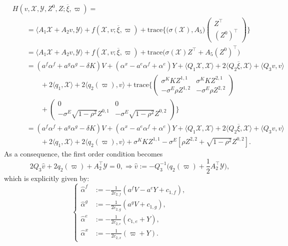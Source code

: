 \documentclass[11pt,twoside]{amsart}
\theoremstyle{definition}
\numberwithin{equation}{section}
\newcommand{\w}{\varpi}
\renewcommand{\bar}{\overline}
\begin{document}
\begin{align*}
&H(v,\mathcal{X}, \mathcal{Y},Z^0,Z;\bar{\xi},\w)= \\
&\qquad =  \langle A_1 \mathcal{X} + A_2v,\mathcal{Y}\rangle + f(\mathcal{X}, v; \bar{\xi}, \w)	+ \text{trace}\bigg\{\bigg( \sigma(\mathcal{X}),A_5\bigg)\begin{pmatrix}
    Z^\top\\
    (Z^0)^\top\end{pmatrix}\bigg\}\\
&\qquad= \langle A_1 \mathcal{X} + A_2v,\mathcal{Y}\rangle + f(\mathcal{X}, v; \bar{\xi}, \w)	+ \text{trace}\bigg( \sigma( \mathcal{X} ) Z^\top +  A_5(Z^0)^\top\bigg) 	\\
&\qquad= (a^f\alpha^{f} + a^g\alpha^{g}- \delta K)V + (\alpha^x -a^e\alpha^f + \alpha^e) Y + \langle Q_1 \mathcal{X} ,\mathcal{X}\rangle+ 2\langle Q_2\overline{\xi}, \mathcal{X}\rangle + \langle Q_3 v, v\rangle  \\
&\qquad\qquad+2\langle q_1, \mathcal{X}\rangle + 2 \langle q_2(\w),v\rangle + \text{trace}\bigg\{ 
\begin{pmatrix}
    \sigma^K K Z^{1,1} & \sigma^K K Z^{2,1}\\
    -\sigma^E \rho Z^{1,2} & -\sigma^E \rho Z^{2,2} 
\end{pmatrix} \\
&\qquad\qquad+ 
\begin{pmatrix}
    0&0\\
    -\sigma^E\sqrt{1-\rho^2}Z^{0,1}&-\sigma^E\sqrt{1-\rho^2}Z^{0,2}
\end{pmatrix}\bigg\}\\ 
&\qquad = (a^f\alpha^{f} + a^g\alpha^{g}- \delta K)V + (\alpha^x -a^e\alpha^f + \alpha^e) Y + \langle Q_1 \mathcal{X} ,\mathcal{X}\rangle+ 2\langle Q_2\overline{\xi}, \mathcal{X}\rangle + \langle Q_3 v, v\rangle  \\
&\qquad\qquad+2\langle q_1, \mathcal{X}\rangle + 2 \langle q_2(\w),v\rangle + \sigma^KKZ^{1,1} - \sigma^E [ \rho Z^{2,2} + \sqrt{1-\rho^2} Z^{0,2}].
\end{align*}
As a consequence, the first order condition becomes
\begin{equation}
\label{eqn: optimal control}
2Q_3 \widehat{v} + 2q_2(\w)+ A_2^\top \mathcal{Y}= 0,\Longrightarrow \widehat{v}:= -Q_3^{-1} \bigg(q_2(\w)+\frac{1}{2}A_2^\top \mathcal{Y}\bigg), 
\end{equation}
which is explicitly given by:
\begin{equation}
\label{eqn: FOC} 
\begin{cases}
\widehat{\alpha}^f &:= -\frac{1}{2c_{2,f}}(a^fV -a^eY + c_{1,f}),\\
\widehat{\alpha}^g &:=-\frac{1}{2c_{2,g}}(a^gV + c_{1,g}),\\
\widehat{\alpha}^e&:= -\frac{1}{2c_{2,e}}(c_{1,e} + Y),\\
\widehat{\alpha}^x&:= -\frac{1}{2c_{2,x}}(\w + Y).
\end{cases}
\end{equation}
\end{document}
